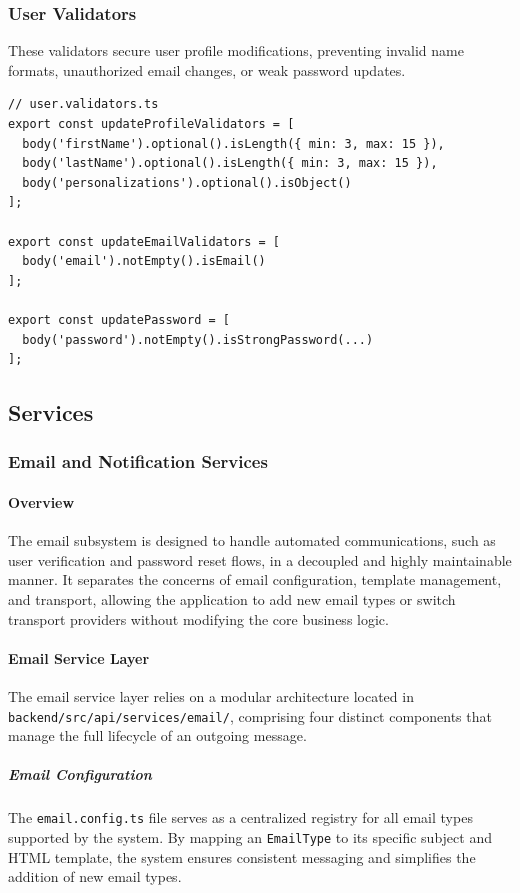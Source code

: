 \subsubsection{User Validators}
These validators secure user profile modifications, preventing invalid name formats, unauthorized email changes, or weak password updates.
\begin{lstlisting}[caption={User profile and account validation}]
// user.validators.ts
export const updateProfileValidators = [
  body('firstName').optional().isLength({ min: 3, max: 15 }),
  body('lastName').optional().isLength({ min: 3, max: 15 }),
  body('personalizations').optional().isObject()
];

export const updateEmailValidators = [
  body('email').notEmpty().isEmail()
];

export const updatePassword = [
  body('password').notEmpty().isStrongPassword(...)
];
\end{lstlisting}

\subsection{Services}
\subsubsection{Email and Notification Services}

\paragraph{Overview}
The email subsystem is designed to handle automated communications, such as user verification and password reset flows, in a decoupled and highly maintainable manner. It separates the concerns of email configuration, template management, and transport, allowing the application to add new email types or switch transport providers without modifying the core business logic.

\paragraph{Email Service Layer}
The email service layer relies on a modular architecture located in \texttt{backend/src/api/services/email/}, comprising four distinct components that manage the full lifecycle of an outgoing message.

\subparagraph{Email Configuration}
The \texttt{email.config.ts} file serves as a centralized registry for all email types supported by the system. By mapping an \texttt{EmailType} to its specific subject and HTML template, the system ensures consistent messaging and simplifies the addition of new email types.

